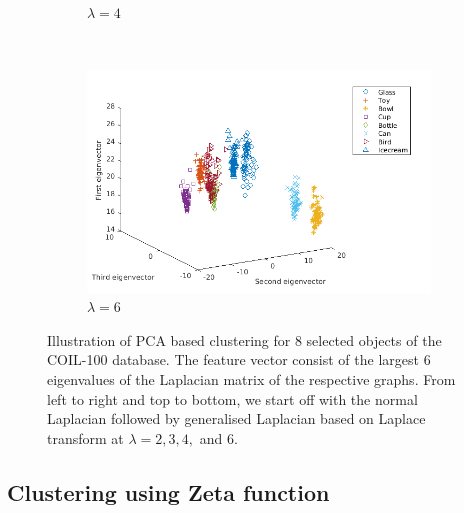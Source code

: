 \documentclass[10pt,a4paper]{article}
\theoremstyle{plain}
\theoremstyle{definition}
\begin{document}
\begin{figure}[H]
\begin{subfigure}[b]{0.5\textwidth}
		\caption{$\lambda=4$}
		\label{}
	\end{subfigure}~
	\begin{subfigure}[b]{0.5\textwidth}
		\includegraphics[width= \textwidth]{images/Laplace-lam6.png}
		\caption{$\lambda=6$}
		\label{}
	\end{subfigure}
	\caption{Illustration of PCA based clustering for $8$ selected objects of the COIL-100 database. The feature vector consist of the largest $6$ eigenvalues of the Laplacian matrix of the respective graphs. From left to right and top to bottom, we start off with the normal Laplacian followed by generalised Laplacian based on Laplace transform at $\lambda =2,3,4,$ and $6$. }
	\label{}
\end{figure}


\subsection{Clustering using Zeta function}
\end{document}
